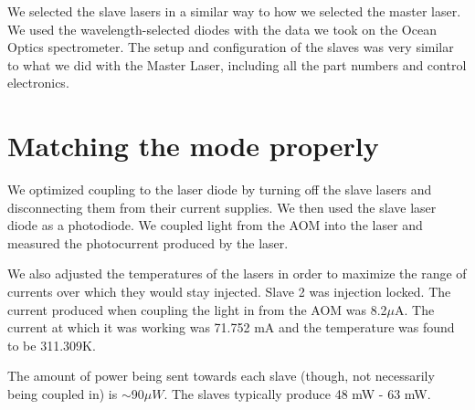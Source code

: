 We selected the slave lasers in a similar way to how we selected the master laser. We used the wavelength-selected diodes with the data we took on the Ocean Optics spectrometer. The setup and configuration of the slaves was very similar to what we did with the Master Laser, including all the part numbers and control electronics.



\section{Matching the mode properly}
We optimized coupling to the laser diode by turning off the slave lasers and disconnecting them from their current supplies. We then used the slave laser diode as a photodiode. We coupled light from the AOM into the laser and measured the photocurrent produced by the laser.

We also adjusted the temperatures of the lasers in order to maximize the range of currents over which they would stay injected. Slave 2 was injection locked. The current produced when coupling the light in from the AOM was 8.2$\mu$A. The current at which it was working was 71.752 mA %
and the temperature was found to be 311.309K. %

The amount of power being sent towards each slave (though, not necessarily being coupled in) is $\sim$90$\mu W$. The slaves typically produce 48 mW - 63 mW.




